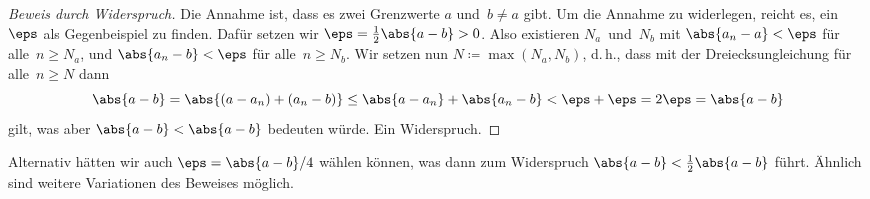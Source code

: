 \documentclass[a4paper]{article}
\begin{document}
\begin{proof}[Beweis durch Widerspruch]
    Die Annahme ist, dass es zwei Grenzwerte $a$ und~$b \neq a$ gibt. Um die Annahme zu widerlegen, reicht es, ein~$\eps$ als Gegenbeispiel zu finden. Dafür setzen wir $\eps = \frac{1}{2}\abs{a-b} > 0$. Also existieren $N_a$~und~$N_b$ mit $\abs{a_n - a} < \eps$ für alle~$n \geq N_a$, und $\abs{a_n - b} < \eps$ für alle~$n \geq N_b$. Wir setzen nun $N \coloneqq \max(N_a, N_b)$, d.\,h., dass mit der Dreiecksungleichung für alle~$n \geq N$ dann
    \begin{equation*}
        \abs{a-b} = \abs{(a-a_n) + (a_n-b)} \leq \abs{a-a_n} + \abs{a_n-b} < \eps + \eps = 2 \eps = \abs{a-b}
    \end{equation*}
    gilt, was aber $\abs{a-b} < \abs{a-b}$ bedeuten würde. Ein Widerspruch.
\end{proof}

Alternativ hätten wir auch $\eps = \abs{a-b}/4$ wählen können, was dann zum Widerspruch $\abs{a-b} < \frac{1}{2}\abs{a-b}$ führt. Ähnlich sind weitere Variationen des Beweises möglich.
\end{document}
